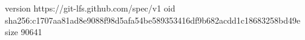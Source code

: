 version https://git-lfs.github.com/spec/v1
oid sha256:c1707aa81ad8e9088f98d5afa54be589353416df9b682acdd1c18683258bd49e
size 90641
